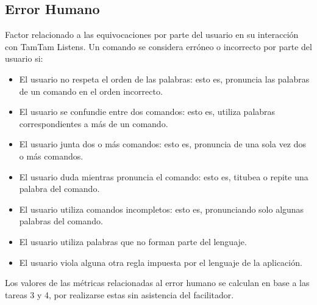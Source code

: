 \subsection{Error Humano}
Factor relacionado a las equivocaciones por parte del usuario en su interacci\'on con
TamTam Listens.
Un comando se considera err\'oneo o incorrecto por parte del usuario si:
\begin{itemize}
	\item El usuario no respeta el orden de las palabras: esto es, pronuncia las palabras de un comando en el orden incorrecto.
	\item El usuario se confundie entre dos comandos: esto es, utiliza palabras correspondientes a m\'as
	de un comando.
	\item El usuario junta dos o m\'as comandos: esto es, pronuncia de una sola vez dos o m\'as comandos.
	\item El usuario duda mientras pronuncia el comando: esto es, titubea o repite una palabra del comando.
	\item El usuario utiliza comandos incompletos: esto es, pronunciando solo algunas palabras del comando.
	\item El usuario utiliza palabras que no forman parte del lenguaje.
	\item El usuario viola alguna otra regla impuesta por el lenguaje de la aplicaci\'on.
\end{itemize}
Los valores de las m\'etricas relacionadas al error humano se calculan
en base a las tareas 3 y 4, por realizarse estas sin asistencia del facilitador. 


